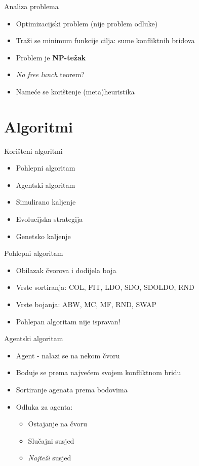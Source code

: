 \documentclass[utf8]{beamer}
\begin{document}
\begin{frame}{Analiza problema}
	\begin{itemize}
		\item Optimizacijski problem (nije problem odluke)
		\pause
		\item Traži se minimum funkcije cilja: sume konfliktnih bridova
		\pause
		\item Problem je \textbf{NP-težak}
		\pause
		\item \emph{No free lunch} teorem?
		\pause
		\item Nameće se korištenje (meta)heuristika
	\end{itemize}
\end{frame}

\section{Algoritmi}
\begin{frame}{Korišteni algoritmi}
	\begin{itemize}
		\item Pohlepni algoritam
		\pause
		\item Agentski algoritam
		\pause
		\item Simulirano kaljenje
		\pause
		\item Evolucijska strategija
		\pause
		\item Genetsko kaljenje
	\end{itemize}
\end{frame}

\begin{frame}{Pohlepni algoritam}
	\begin{itemize}
		\item Obilazak čvorova i dodijela boja
		\pause
		\item Vrste sortiranja: COL, FIT, LDO, SDO, SDOLDO, RND
		\pause
		\item Vrste bojanja: ABW, MC, MF, RND, SWAP
		\pause
		\item Pohlepan algoritam nije ispravan!
	\end{itemize}
\end{frame}

\begin{frame}{Agentski algoritam}
	\begin{itemize}
		\item Agent - nalazi se na nekom čvoru
		\item Boduje se prema najvećem svojem konfliktnom bridu
		\item Sortiranje agenata prema bodovima
		\item Odluka za agenta: 
			\begin{itemize}
				\item Ostajanje na čvoru
				\item Slučajni susjed
				\item \emph{Najteži} susjed
			\end{itemize}
		\end{itemize}
\end{frame}
\end{document}
